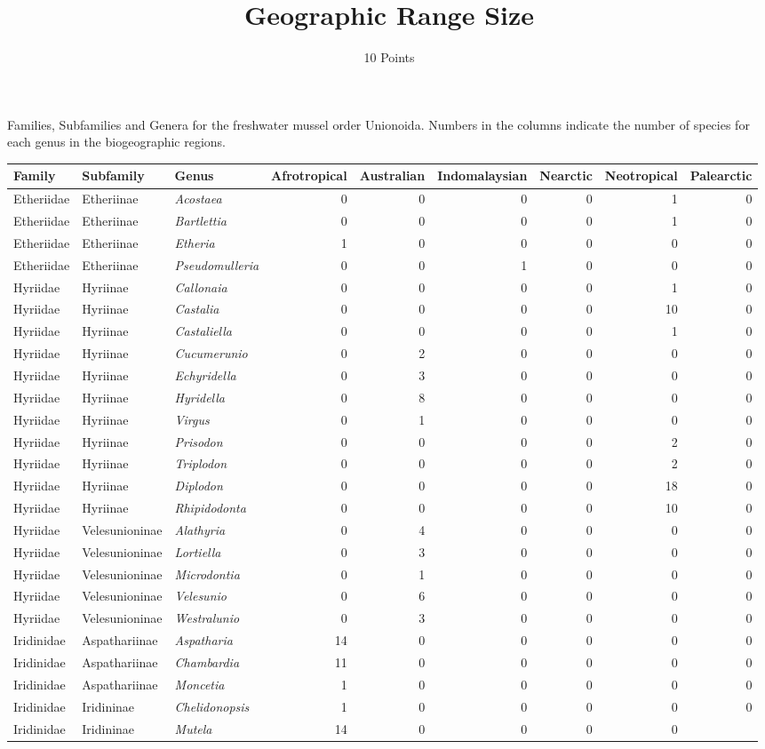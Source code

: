 \documentclass[11pt]{article}
\title{Geographic Range Size}
\author{10 Points}
\date{}                                           %
\begin{document}

Families, Subfamilies and Genera for the freshwater mussel order Unionoida. Numbers in the columns indicate the number of species for each genus in the biogeographic regions.

\begin{longtable}[l]{@{}lllrrrrrr@{}}
\toprule
Family & Subfamily & Genus &
Afrotropical & Australian & Indomalaysian &
Nearctic & Neotropical &
Palearctic\tabularnewline
\midrule
\endhead
Etheriidae & Etheriinae & \textit{Acostaea} & 0 & 0 & 0 & 0 & 1 &
0\tabularnewline
Etheriidae & Etheriinae & \textit{Bartlettia} & 0 & 0 & 0 & 0 & 1 &
0\tabularnewline
Etheriidae & Etheriinae & \textit{Etheria} & 1 & 0 & 0 & 0 & 0 &
0\tabularnewline
Etheriidae & Etheriinae & \textit{Pseudomulleria} & 0 & 0 & 1 & 0 & 0 &
0\tabularnewline
Hyriidae & Hyriinae & \textit{Callonaia} & 0 & 0 & 0 & 0 & 1 &
0\tabularnewline
Hyriidae & Hyriinae & \textit{Castalia} & 0 & 0 & 0 & 0 & 10 &
0\tabularnewline
Hyriidae & Hyriinae & \textit{Castaliella} & 0 & 0 & 0 & 0 & 1 &
0\tabularnewline
Hyriidae & Hyriinae & \textit{Cucumerunio} & 0 & 2 & 0 & 0 & 0 &
0\tabularnewline
Hyriidae & Hyriinae & \textit{Echyridella} & 0 & 3 & 0 & 0 & 0 &
0\tabularnewline
Hyriidae & Hyriinae & \textit{Hyridella} & 0 & 8 & 0 & 0 & 0 &
0\tabularnewline
Hyriidae & Hyriinae & \textit{Virgus} & 0 & 1 & 0 & 0 & 0 &
0\tabularnewline
Hyriidae & Hyriinae & \textit{Prisodon} & 0 & 0 & 0 & 0 & 2 &
0\tabularnewline
Hyriidae & Hyriinae & \textit{Triplodon} & 0 & 0 & 0 & 0 & 2 &
0\tabularnewline
Hyriidae & Hyriinae & \textit{Diplodon} & 0 & 0 & 0 & 0 & 18 &
0\tabularnewline
Hyriidae & Hyriinae & \textit{Rhipidodonta} & 0 & 0 & 0 & 0 & 10 &
0\tabularnewline
Hyriidae & Velesunioninae & \textit{Alathyria} & 0 & 4 & 0 & 0 & 0 &
0\tabularnewline
Hyriidae & Velesunioninae & \textit{Lortiella} & 0 & 3 & 0 & 0 & 0 &
0\tabularnewline
Hyriidae & Velesunioninae & \textit{Microdontia} & 0 & 1 & 0 & 0 & 0 &
0\tabularnewline
Hyriidae & Velesunioninae & \textit{Velesunio} & 0 & 6 & 0 & 0 & 0 &
0\tabularnewline
Hyriidae & Velesunioninae & \textit{Westralunio} & 0 & 3 & 0 & 0 & 0 &
0\tabularnewline
Iridinidae & Aspathariinae & \textit{Aspatharia} & 14 & 0 & 0 & 0 & 0 &
0\tabularnewline
Iridinidae & Aspathariinae & \textit{Chambardia} & 11 & 0 & 0 & 0 & 0 &
0\tabularnewline
Iridinidae & Aspathariinae & \textit{Moncetia} & 1 & 0 & 0 & 0 & 0 &
0\tabularnewline
Iridinidae & Iridininae & \textit{Chelidonopsis} & 1 & 0 & 0 & 0 & 0 &
0\tabularnewline
Iridinidae & Iridininae & \textit{Mutela} & 14 & 0 & 0 & 0 & 0 &

\end{longtable}
\end{document}
